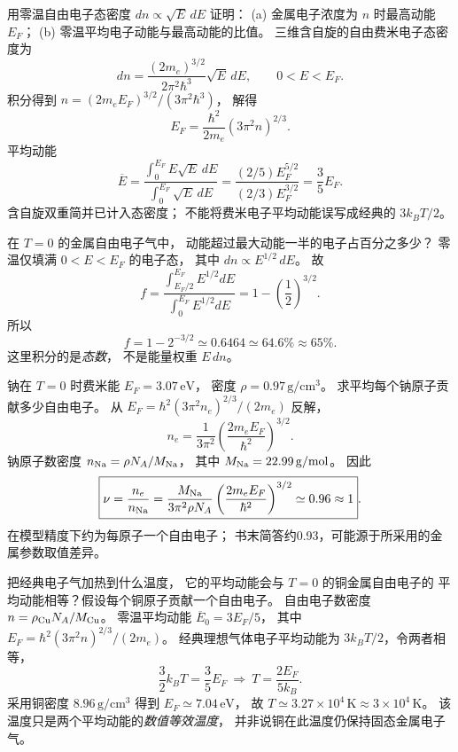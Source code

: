 用零温自由电子态密度
$dn\propto\sqrt E\,dE$ 证明：
(a) 金属电子浓度为 $n$ 时最高动能 $E_F$；
(b) 零温平均电子动能与最高动能的比值。
\exsolution
三维含自旋的自由费米电子态密度为
\[
 dn=\frac{(2m_e)^{3/2}}{2\pi^2\hbar^3}
 \sqrt E\,dE,\qquad 0<E<E_F.
\]
积分得到
$n=(2m_eE_F)^{3/2}/(3\pi^2\hbar^3)$，
解得
\[
 \boxed{E_F=\frac{\hbar^2}{2m_e}(3\pi^2n)^{2/3}}.
\]
平均动能
\[
 \overline E=\frac{\int_0^{E_F}E\sqrt E\,dE}
 {\int_0^{E_F}\sqrt E\,dE}
 =\frac{(2/5)E_F^{5/2}}{(2/3)E_F^{3/2}}
 =\boxed{\frac35E_F}.
\]
\excheck 含自旋双重简并已计入态密度；
不能将费米电子平均动能误写成经典的 $3k_BT/2$。

在 $T=0$ 的金属自由电子气中，
动能超过最大动能一半的电子占百分之多少？
\exsolution
零温仅填满 $0<E<E_F$ 的电子态，
其中 $dn\propto E^{1/2}\,dE$。
故
\[
 f=\frac{\int_{E_F/2}^{E_F}E^{1/2}dE}
 {\int_0^{E_F}E^{1/2}dE}
 =1-\left(\frac12\right)^{3/2}.
\]
所以
\[
 \boxed{f=1-2^{-3/2}\simeq0.6464
 \simeq64.6\%\approx65\%}.
\]
\excheck 这里积分的是\emph{态数}，
不是能量权重 $E\,dn$。

钠在 $T=0$ 时费米能
$E_F=3.07\,\mathrm{eV}$，
密度 $\rho=0.97\,\mathrm{g/cm^3}$。
求平均每个钠原子贡献多少自由电子。
\exsolution
从
$E_F=\hbar^2(3\pi^2n_e)^{2/3}/(2m_e)$ 反解，
\[
 n_e=\frac1{3\pi^2}
 \left(\frac{2m_eE_F}{\hbar^2}\right)^{3/2}.
\]
钠原子数密度
$n_{\rm Na}=\rho N_A/M_{\rm Na}$，
其中 $M_{\rm Na}=22.99\,\mathrm{g/mol}$。
因此
\[
 \boxed{\nu=\frac{n_e}{n_{\rm Na}}
 =\frac{M_{\rm Na}}{3\pi^2\rho N_A}
 \left(\frac{2m_eE_F}{\hbar^2}\right)^{3/2}
 \simeq0.96\approx1}.
\]
\excheck 在模型精度下约为每原子一个自由电子；
书末简答约0.93，可能源于所采用的金属参数取值差异。

把经典电子气加热到什么温度，
它的平均动能会与 $T=0$ 的铜金属自由电子的
平均动能相等？假设每个铜原子贡献一个自由电子。
\exsolution
自由电子数密度
$n=\rho_{\rm Cu}N_A/M_{\rm Cu}$。
零温平均动能 $\overline E_0=3E_F/5$，
其中
$E_F=\hbar^2(3\pi^2n)^{2/3}/(2m_e)$。
经典理想气体电子平均动能为
$3k_BT/2$，令两者相等，
\[
 \frac32k_BT=\frac35E_F
 \ \Longrightarrow\
 \boxed{T=\frac{2E_F}{5k_B}}.
\]
采用铜密度 $8.96\,\mathrm{g/cm^3}$
得到 $E_F\simeq7.04\,\mathrm{eV}$，
故
$\boxed{T\simeq3.27\times10^4\,\mathrm K
 \approx3\times10^4\,\mathrm K}$。
\excheck 该温度只是两个平均动能的\emph{数值等效温度}，
并非说铜在此温度仍保持固态金属电子气。

